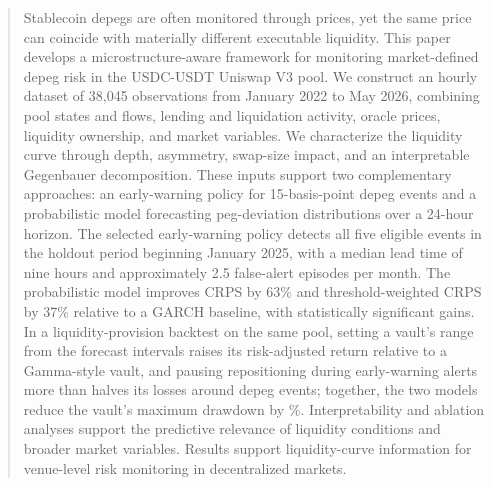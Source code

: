 \documentclass[a4paper,fleqn]{cas-sc}
\begin{document}




\begin{abstract}
Stablecoin depegs are often monitored through prices, yet the same price can coincide with materially different executable liquidity. This paper develops a microstructure-aware framework for monitoring market-defined depeg risk in the USDC-USDT Uniswap V3 pool. We construct an hourly dataset of 38,045 observations from January 2022 to May 2026, combining pool states and flows, lending and liquidation activity, oracle prices, liquidity ownership, and market variables. We characterize the liquidity curve through depth, asymmetry, swap-size impact, and an interpretable Gegenbauer decomposition. These inputs support two complementary approaches: an early-warning policy for 15-basis-point depeg events and a probabilistic model forecasting peg-deviation distributions over a 24-hour horizon. The selected early-warning policy detects all five eligible events in the holdout period beginning January 2025, with a median lead time of nine hours and approximately 2.5 false-alert episodes per month. The probabilistic model improves CRPS by 63\% and threshold-weighted CRPS by 37\% relative to a GARCH baseline, with statistically significant gains. In a liquidity-provision backtest on the same pool, setting a vault's range from the forecast intervals raises its risk-adjusted return relative to a Gamma-style vault, and pausing repositioning during early-warning alerts more than halves its losses around depeg events; together, the two models reduce the vault's maximum drawdown by \lpFcKvsGammaMaxDDCut\%. Interpretability and ablation analyses support the predictive relevance of liquidity conditions and broader market variables. Results support liquidity-curve information for venue-level risk monitoring in decentralized markets.
\end{abstract}
\end{document}

